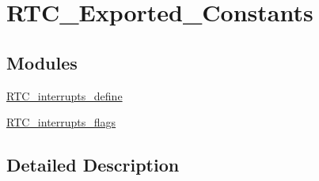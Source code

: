 \hypertarget{group___r_t_c___exported___constants}{}\section{R\+T\+C\+\_\+\+Exported\+\_\+\+Constants}
\label{group___r_t_c___exported___constants}
\subsection*{Modules}
\begin{DoxyCompactItemize}
\item 
\hyperlink{group___r_t_c__interrupts__define}{R\+T\+C\+\_\+interrupts\+\_\+define}
\item 
\hyperlink{group___r_t_c__interrupts__flags}{R\+T\+C\+\_\+interrupts\+\_\+flags}
\end{DoxyCompactItemize}


\subsection{Detailed Description}
